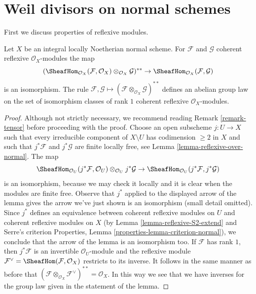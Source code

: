 \section{Weil divisors on normal schemes}
\label{section-weil-divisors-normal}

\noindent
First we discuss properties of reflexive modules.

\begin{lemma}
\label{lemma-reflexive-normal}
Let $X$ be an integral locally Noetherian normal scheme.
For $\mathcal{F}$ and $\mathcal{G}$ coherent reflexive
$\mathcal{O}_X$-modules the map
$$
(\SheafHom_{\mathcal{O}_X}(\mathcal{F}, \mathcal{O}_X)
\otimes_{\mathcal{O}_X} \mathcal{G})^{**} \to
\SheafHom_{\mathcal{O}_X}(\mathcal{F}, \mathcal{G})
$$
is an isomorphism. The rule $\mathcal{F}, \mathcal{G} \mapsto
(\mathcal{F} \otimes_{\mathcal{O}_X} \mathcal{G})^{**}$
defines an abelian group law on the set of isomorphism classes of rank $1$
coherent reflexive $\mathcal{O}_X$-modules.
\end{lemma}

\begin{proof}
Although not strictly necessary, we recommend reading
Remark \ref{remark-tensor} before proceeding with the proof.
Choose an open subscheme $j : U \to X$ such that
every irreducible component of $X \setminus U$ has codimension $\geq 2$
in $X$ and such that $j^*\mathcal{F}$ and $j^*\mathcal{G}$ are finite
locally free, see Lemma \ref{lemma-reflexive-over-normal}.
The map
$$
\SheafHom_{\mathcal{O}_U}(j^*\mathcal{F}, \mathcal{O}_U)
\otimes_{\mathcal{O}_U} j^*\mathcal{G} \to
\SheafHom_{\mathcal{O}_U}(j^*\mathcal{F}, j^*\mathcal{G})
$$
is an isomorphism, because we may check it locally and it is
clear when the modules are finite free. Observe that $j^*$
applied to the displayed arrow of the lemma gives the arrow
we've just shown is an isomorphism (small detail omitted).
Since $j^*$ defines an equivalence between coherent reflexive modules on $U$
and coherent reflexive modules on $X$
(by Lemma \ref{lemma-reflexive-S2-extend} and Serre's criterion
Properties, Lemma \ref{properties-lemma-criterion-normal}),
we conclude that the arrow of the lemma is an isomorphism too.
If $\mathcal{F}$ has rank $1$, then $j^*\mathcal{F}$
is an invertible $\mathcal{O}_U$-module and the reflexive module
$\mathcal{F}^\vee = \SheafHom(\mathcal{F}, \mathcal{O}_X)$
restricts to its inverse. It follows in the same manner as before that
$(\mathcal{F} \otimes_{\mathcal{O}_X} \mathcal{F}^\vee)^{**} = \mathcal{O}_X$.
In this way we see that we have inverses for the group law
given in the statement of the lemma.
\end{proof}

